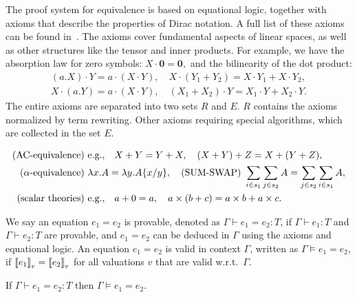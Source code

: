 The proof system for equivalence is based on equational logic, together with axioms that describe the properties of Dirac notation. A full list of these axioms can be found in~. The axioms cover fundamental aspects of linear spaces, as well as other structures like the tensor and inner products. For example, we have the absorption law for zero symbols:
\(X \cdot \mathbf{0} = \mathbf{0},\)
and the bilinearity of the dot product:
\begin{align*}
(a.X) \cdot Y = a \cdot (X \cdot Y), \quad X \cdot (Y_1 + Y_2) = X \cdot Y_1 + X \cdot Y_2, \\
X \cdot (a.Y) = a \cdot (X \cdot Y), \quad (X_1 + X_2) \cdot Y = X_1 \cdot Y + X_2 \cdot Y.
\end{align*}
The entire axioms are separated into two sets $R$ and $E$.
$R$ contains the axioms normalized by term rewriting. Other axioms requiring special algorithms, which are collected in the set $E$.
\begin{definition}
\label{def: axiom E}
\begin{align*}
    \textup{(AC-equivalence)} &\ \text{e.g.,} \quad X + Y = Y + X, \quad (X + Y) + Z = X + (Y + Z), \\
    \textup{($\alpha$-equivalence)} &\ \lambda x . A = \lambda y . A\{x/y\},
    \quad
    \textup{(SUM-SWAP)} \ \sum_{i \in s_1} \sum_{j \in s_2} A = \sum_{j \in s_2} \sum_{i \in s_1} A, \\
    \textup{(scalar theories)} &\ \text{e.g.,} \quad a + 0 = a, \quad a \times (b + c) = a \times b + a \times c.
\end{align*}
\end{definition}



We say an equation $e_1 = e_2$ is provable, denoted as $\Gamma \vdash e_1 = e_2 : T$, if $\Gamma \vdash e_1 : T$ and $\Gamma \vdash e_2 : T$ are provable, and $e_1 = e_2$ can be deduced in $\Gamma$ using the axioms and equational logic.
An equation \( e_1 = e_2 \) is valid in context $\Gamma$, written as \(
\Gamma \vDash e_1 = e_2 \), if \( {\llbracket e_1 \rrbracket}_v = {\llbracket e_2 \rrbracket}_v \) for
all valuations \( v \) that are valid w.r.t.\, \( \Gamma \).

\begin{theorem}\label{lem: axiom sound}
If \( \Gamma \vdash e_1 = e_2 :T \) then \( \Gamma \vDash e_1 = e_2\).
\end{theorem}
\begin{hproof}
\end{hproof}

